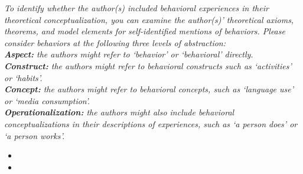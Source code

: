 \documentclass[10pt,a4paper]{protocol}
\begin{document}
\clearpage
\vspace*{2em}


\textit{To identify whether the author(s) included behavioral experiences in their theoretical conceptualization, you can examine the author(s)' theoretical axioms, theorems, and model elements for self-identified mentions of behaviors. Please consider behaviors at the following three levels of abstraction:\\
\textbf{Aspect:} the authors might refer to `behavior' or `behavioral' directly.\\
\textbf{Construct:} the authors might refer to behavioral constructs such as `activities' or `habits'.\\
\textbf{Concept:} the authors might refer to behavioral concepts, such as `language use' or `media consumption'.\\
\textbf{Operationalization:} the authors might also include behavioral conceptualizations in their descriptions of experiences, such as `a person does' or `a person works'.}
\vspace{0.5em}
\begin{itemize}
	\item {}
	\item {}
\end{itemize}
\divider
\end{document}

